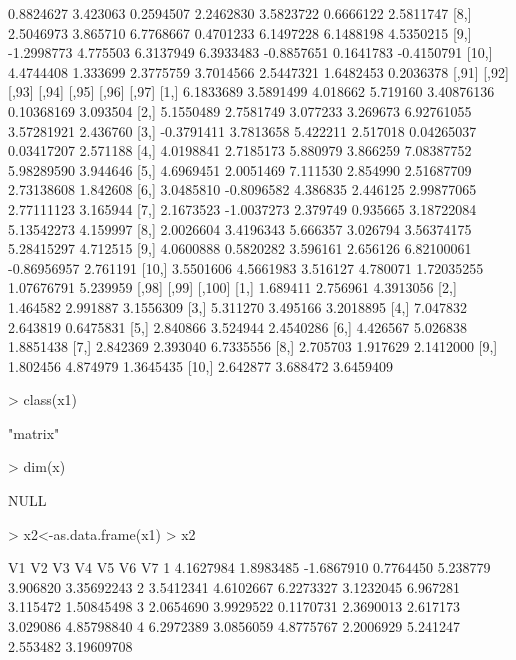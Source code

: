 \documentclass[12pt]{article}
\begin{document}
\begin{Schunk}
\begin{Soutput}
 [7,]  0.8824627 3.423063  0.2594507 2.2462830  3.5823722 0.6666122  2.5811747
 [8,]  2.5046973 3.865710  6.7768667 0.4701233  6.1497228 6.1488198  4.5350215
 [9,] -1.2998773 4.775503  6.3137949 6.3933483 -0.8857651 0.1641783 -0.4150791
[10,]  4.4744408 1.333699  2.3775759 3.7014566  2.5447321 1.6482453  0.2036378
           [,91]      [,92]    [,93]    [,94]      [,95]       [,96]    [,97]
 [1,]  6.1833689  3.5891499 4.018662 5.719160 3.40876136  0.10368169 3.093504
 [2,]  5.1550489  2.7581749 3.077233 3.269673 6.92761055  3.57281921 2.436760
 [3,] -0.3791411  3.7813658 5.422211 2.517018 0.04265037  0.03417207 2.571188
 [4,]  4.0198841  2.7185173 5.880979 3.866259 7.08387752  5.98289590 3.944646
 [5,]  4.6969451  2.0051469 7.111530 2.854990 2.51687709  2.73138608 1.842608
 [6,]  3.0485810 -0.8096582 4.386835 2.446125 2.99877065  2.77111123 3.165944
 [7,]  2.1673523 -1.0037273 2.379749 0.935665 3.18722084  5.13542273 4.159997
 [8,]  2.0026604  3.4196343 5.666357 3.026794 3.56374175  5.28415297 4.712515
 [9,]  4.0600888  0.5820282 3.596161 2.656126 6.82100061 -0.86956957 2.761191
[10,]  3.5501606  4.5661983 3.516127 4.780071 1.72035255  1.07676791 5.239959
         [,98]    [,99]    [,100]
 [1,] 1.689411 2.756961 4.3913056
 [2,] 1.464582 2.991887 3.1556309
 [3,] 5.311270 3.495166 3.2018895
 [4,] 7.047832 2.643819 0.6475831
 [5,] 2.840866 3.524944 2.4540286
 [6,] 4.426567 5.026838 1.8851438
 [7,] 2.842369 2.393040 6.7335556
 [8,] 2.705703 1.917629 2.1412000
 [9,] 1.802456 4.874979 1.3645435
[10,] 2.642877 3.688472 3.6459409
\end{Soutput}
\begin{Sinput}
> class(x1)
\end{Sinput}
\begin{Soutput}
[1] "matrix"
\end{Soutput}
\begin{Sinput}
> dim(x)
\end{Sinput}
\begin{Soutput}
NULL
\end{Soutput}
\begin{Sinput}
> x2<-as.data.frame(x1)
> x2
\end{Sinput}
\begin{Soutput}
           V1        V2         V3        V4       V5       V6         V7
1   4.1627984 1.8983485 -1.6867910 0.7764450 5.238779 3.906820 3.35692243
2   3.5412341 4.6102667  6.2273327 3.1232045 6.967281 3.115472 1.50845498
3   2.0654690 3.9929522  0.1170731 2.3690013 2.617173 3.029086 4.85798840
4   6.2972389 3.0856059  4.8775767 2.2006929 5.241247 2.553482 3.19609708

\end{Soutput}
\end{Schunk}
\end{document}
